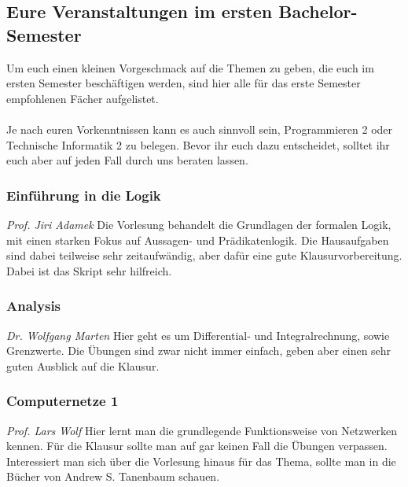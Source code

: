 \begin{multicols}{2}
\subsection{Eure Veranstaltungen im ersten Bachelor-Semester}
	Um euch einen kleinen Vorgeschmack auf die Themen zu geben, die euch im ersten Semester beschäftigen werden, sind hier alle für das erste Semester empfohlenen Fächer aufgelistet.\\\\
	Je nach euren Vorkenntnissen kann es auch sinnvoll sein, Programmieren 2 oder Technische Informatik 2 zu belegen. Bevor ihr euch dazu entscheidet, solltet ihr euch aber auf jeden Fall durch uns beraten lassen.

\subsubsection{Einführung in die Logik}
	\textit{Prof. Jiri Adamek}
	Die Vorlesung behandelt die Grundlagen der formalen Logik, mit einen starken Fokus auf Aussagen- und Prädikatenlogik. Die Hausaufgaben sind dabei teilweise sehr zeitaufwändig, aber dafür eine gute Klausurvorbereitung. Dabei ist das Skript sehr hilfreich.

\subsubsection{Analysis}
	\textit{Dr. Wolfgang Marten}
	Hier geht es um Differential- und Integralrechnung, sowie Grenzwerte. Die Übungen sind zwar nicht immer einfach, geben aber einen sehr guten Ausblick auf die Klausur.

\subsubsection{Computernetze 1}
	\textit{Prof. Lars Wolf}
	Hier lernt man die grundlegende Funktionsweise von Netzwerken kennen. Für die Klausur sollte man auf gar keinen Fall die Übungen verpassen. Interessiert man sich über die Vorlesung hinaus für das Thema, sollte man in die Bücher von Andrew S. Tanenbaum schauen.



\end{multicols}
